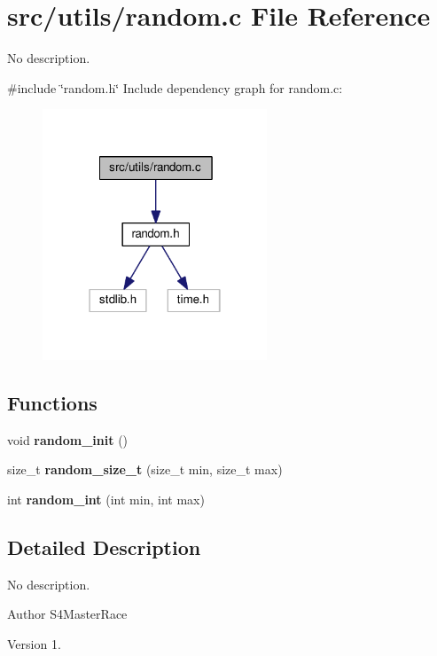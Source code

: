 \section{src/utils/random.c File Reference}
\label{random_8c}


No description.  


{\ttfamily \#include \char`\"{}random.\+h\char`\"{}}\newline
Include dependency graph for random.\+c\+:
\nopagebreak
\begin{figure}[H]
\begin{center}
\leavevmode
\includegraphics[width=190pt]{random_8c__incl}
\end{center}
\end{figure}
\subsection*{Functions}
\begin{DoxyCompactItemize}
\item 
void \textbf{ random\+\_\+init} ()
\item 
size\+\_\+t \textbf{ random\+\_\+size\+\_\+t} (size\+\_\+t min, size\+\_\+t max)
\item 
int \textbf{ random\+\_\+int} (int min, int max)
\end{DoxyCompactItemize}


\subsection{Detailed Description}
No description. 

\begin{DoxyAuthor}{Author}
S4\+Master\+Race 
\end{DoxyAuthor}
\begin{DoxyVersion}{Version}
1. 
\end{DoxyVersion}


